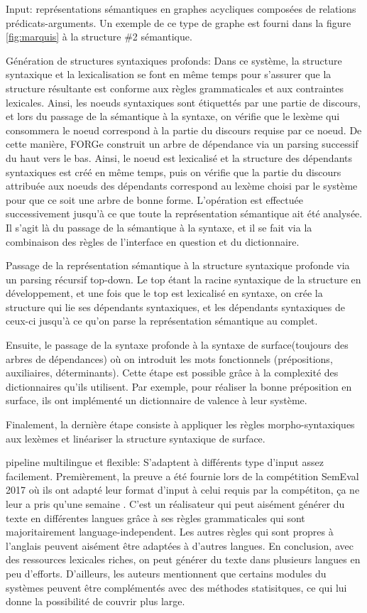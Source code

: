 Input: représentations sémantiques en graphes acycliques composées de relations prédicats-arguments. Un exemple de ce type de graphe est fourni dans la figure \ref{fig:marquis} à la structure \#2 sémantique. 

Génération de structures syntaxiques profonds: Dans ce système, la structure syntaxique et la lexicalisation se font en même temps pour s'assurer que la structure résultante est conforme aux règles grammaticales et aux contraintes lexicales. Ainsi, les noeuds syntaxiques sont étiquettés par une partie de discours, et lors du passage de la sémantique à la syntaxe, on vérifie que le lexème qui consommera le noeud correspond à la partie du discours requise par ce noeud. De cette manière, FORGe construit un arbre de dépendance via un parsing successif du haut vers le bas. Ainsi, le noeud est lexicalisé et la structure des dépendants syntaxiques est créé en même temps, puis on vérifie que la partie du discours attribuée aux noeuds des dépendants correspond au lexème choisi par le système pour que ce soit une arbre de bonne forme. L'opération est effectuée successivement jusqu'à ce que toute la représentation sémantique ait été analysée. Il s'agit là du passage de la sémantique à la syntaxe, et il se fait via la combinaison des règles de l'interface en question et du dictionnaire.

Passage de la représentation sémantique à la structure syntaxique profonde via un parsing récursif top-down. Le top étant la racine syntaxique de la structure en développement, et une fois que le top est lexicalisé en syntaxe, on crée la structure qui lie ses dépendants syntaxiques, et les dépendants syntaxiques de ceux-ci jusqu'à ce qu'on parse la représentation sémantique au complet.

Ensuite, le passage de la syntaxe profonde à la syntaxe de surface(toujours des arbres de dépendances) où on introduit les mots fonctionnels (prépositions, auxiliaires, déterminants). Cette étape est possible grâce à la complexité des dictionnaires qu'ils utilisent. Par exemple, pour réaliser la bonne préposition en surface, ils ont implémenté un dictionnaire de valence à leur système. 

Finalement, la dernière étape consiste à appliquer les règles morpho-syntaxiques aux lexèmes et linéariser la structure syntaxique de surface.

pipeline multilingue et flexible: S'adaptent à différents type d'input assez facilement. Premièrement, la preuve a été fournie lors de la compétition SemEval 2017 où ils ont adapté leur format d'input à celui requis par la compétiton, ça ne leur a pris qu'une semaine \citep{DBLP:conf/semeval/MilleCBW17}. C'est un réalisateur qui peut aisément générer du texte en différentes langues grâce à ses règles grammaticales qui sont majoritairement language-independent. Les autres règles qui sont propres à l'anglais peuvent aisément être adaptées à d'autres langues. En conclusion, avec des ressources lexicales riches, on peut générer du texte dans plusieurs langues en peu d'efforts. D'ailleurs, les auteurs mentionnent que certains modules du systèmes peuvent être complémentés avec des méthodes statisitques, ce qui lui donne la possibilité de couvrir plus large.

